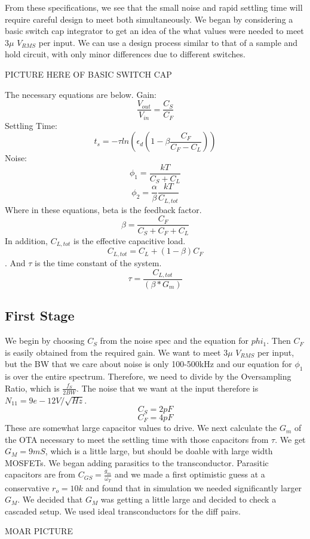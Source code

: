 \documentclass[conference]{IEEEtran}
\begin{document}
From these specifications, we see that the small noise and rapid settling time will require careful design to meet both simultaneously. We began by considering a basic switch cap integrator to get an idea of the what values were needed to meet $3\mu$ $V_{RMS}$ per input. We can use a design process similar to that of a sample and hold circuit, with only minor differences due to different switches.

PICTURE HERE OF BASIC SWITCH CAP

The necessary equations are below. \newline
Gain:
$$\frac{V_{out}}{V_{in}}=\frac{C_S}{C_F}$$
Settling Time:
$$t_s = -\tau ln \left(\epsilon_d \left(1-\beta \frac{C_F}{C_F-C_L}\right)\right)$$
Noise:
$$\phi_1 = \frac{kT}{C_S + C_L}$$
$$\phi_2 = \frac{\alpha}{\beta}\frac{kT}{C_{L,tot}}$$
Where in these equations, beta is the feedback factor. $$\beta = \frac{C_F}{C_S + C_F + C_L}$$ 
In addition, $C_{L,tot}$ is the effective capacitive load.$$C_{L,tot}=C_L+(1-\beta)C_F$$.
And $\tau$ is the time constant of the system. $$\tau = \frac{C_{L,tot}}{(\beta*G_m)}$$

\subsection{First Stage}

We begin by choosing $C_S$ from the noise spec and the equation for $phi_1$. Then $C_F$ is easily obtained from the required gain. We want to meet $3\mu$ $V_{RMS}$ per input, but the BW that we care about noise is only 100-500kHz and our equation for $\phi_1$ is over the entire spectrum. Therefore, we need to divide by the Oversampling Ratio, which is $\frac{f_S}{2BW}$. The noise that we want at the input therefore is $N_{11}=9e-12 V/\sqrt{Hz}$.
$$C_S = 2pF$$ 
$$C_F = 4pF$$
These are somewhat large capacitor values to drive. We next calculate the $G_m$ of the OTA necessary to meet the settling time with those capacitors from $\tau$. We get $G_M = 9mS$, which is a little large, but should be doable with large width MOSFETs.
We began adding parasitics to the transconductor. Parasitic capacitors are from $C_{GS}=\frac{g_m}{\omega_T}$ and we made a first optimistic guess at a conservative $r_o=10k$ and found that in simulation we needed significantly larger $G_M$.
We decided that $G_M$ was getting a little large and decided to check a cascaded setup. We used ideal transconductors for the diff pairs.

 MOAR PICTURE
 
\end{document}
